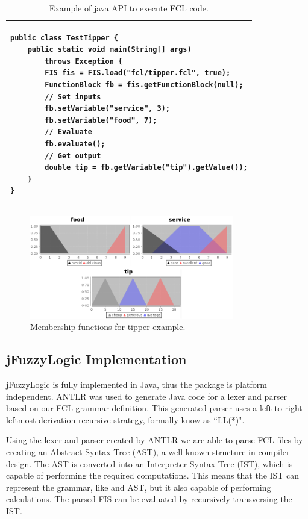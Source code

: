 \documentclass[conference]{IEEEtran}
\begin{document}
\begin{table}[!t]
\caption{Example of java API to execute FCL code.}
\label{t:javaexample}
\centering
\begin{tabular}{|l|}
\hline
\begin{lstlisting}
public class TestTipper {
	public static void main(String[] args) 
		throws Exception {
		FIS fis = FIS.load("fcl/tipper.fcl", true);
		FunctionBlock fb = fis.getFunctionBlock(null);
		// Set inputs
		fb.setVariable("service", 3); 
		fb.setVariable("food", 7);
		// Evaluate
		fb.evaluate(); 
		// Get output
		double tip = fb.getVariable("tip").getValue());
	}
}
\end{lstlisting} \\
\hline
\end{tabular}
\end{table}

\begin{figure}[!t]
\centering
\includegraphics[width=3.5in]{figs/tipper_MF.png}
\caption{Membership functions for tipper example.}
\label{f:tipperMf}
\end{figure}


\subsection{jFuzzyLogic Implementation \label{sec:implement}}

jFuzzyLogic is fully implemented in Java, thus the package is platform independent. 
ANTLR\cite{parr2007definitive} was used to generate Java code for a lexer and parser based on our FCL grammar definition. 
This generated parser uses a left to right leftmost derivation recursive strategy, formally know as ``LL(*)".

Using the lexer and parser created by ANTLR we are able to parse FCL files by creating an Abstract Syntax Tree (AST), a well known structure in compiler design. 
The AST is converted into an Interpreter Syntax Tree (IST), which is capable of performing the required computations.
This means that the IST can represent the grammar, like and AST, but it also capable of performing calculations. 
The parsed FIS can be evaluated by recursively transversing the IST.
\end{document}
